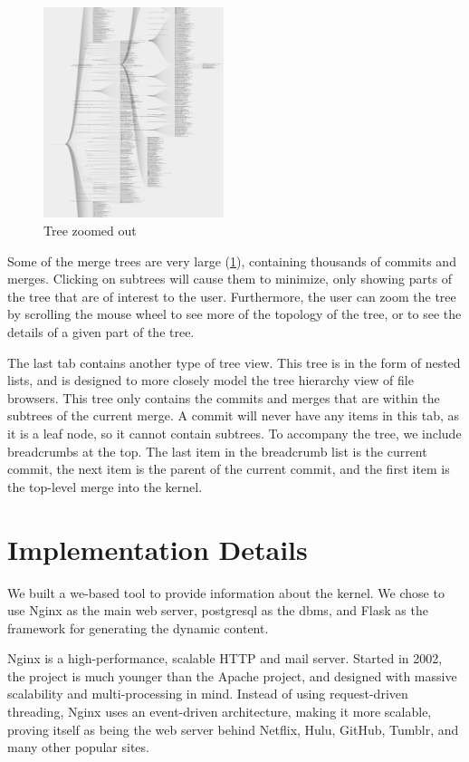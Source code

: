 \documentclass[conference, draftclsnofoot]{IEEEtran}
\begin{document}
\begin{figure}[h]
	\centering
	\includegraphics[width=0.47\textwidth]{figures/tree_zoom.png}
	\caption{Tree zoomed out}
	\label{fig:zoomed_tree}
\end{figure}

Some of the merge trees are very large (\ref{fig:zoomed_tree}), containing
thousands of commits and merges. Clicking on subtrees will cause them to
minimize, only showing parts of the tree that are of interest to the user.
Furthermore, the user can zoom the tree by scrolling the mouse wheel to see
more of the topology of the tree, or to see the details of a given part of the
tree.

The last tab contains another type of tree view. This tree is in the form of
nested lists, and is designed to more closely model the tree hierarchy view of
file browsers. This tree only contains the commits and merges that are within
the subtrees of the current merge. A commit will never have any items in this
tab, as it is a leaf node, so it cannot contain subtrees. To accompany the
tree, we include breadcrumbs at the top. The last item in the breadcrumb list
is the current commit, the next item is the parent of the current commit, and
the first item is the top-level merge into the kernel.

\section{Implementation Details}
We built a we-based tool to provide information about the kernel.
We chose to use Nginx as the main web server, postgresql as the dbms, and Flask
as the framework for generating the dynamic content.

Nginx is a high-performance, scalable HTTP and mail server. Started in 2002,
the project is much younger than the Apache project, and designed with massive
scalability and multi-processing in mind. Instead of using request-driven
threading, Nginx uses an event-driven architecture, making it more scalable,
proving itself as being the web server behind Netflix, Hulu, GitHub, Tumblr,
and many other popular sites.
\end{document}
